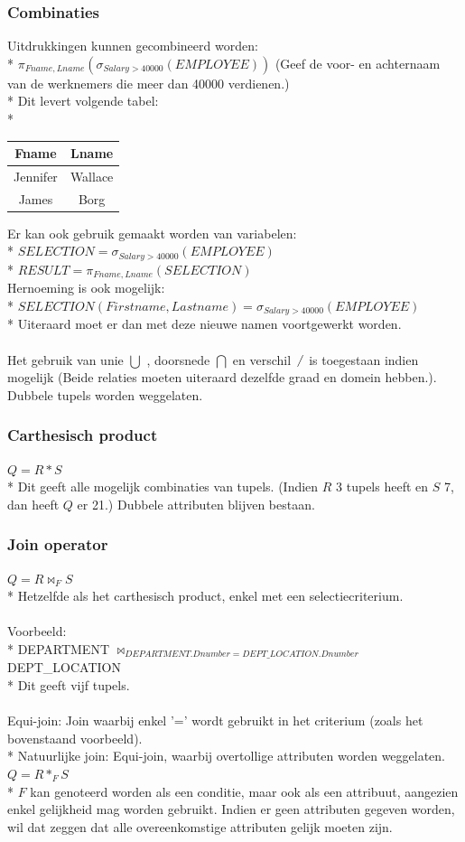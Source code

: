 \documentclass[10pt]{article}
\begin{document}
\subsubsection{Combinaties}
Uitdrukkingen kunnen gecombineerd worden:\\*
$\pi_{Fname, Lname}(\sigma_{Salary > 40000}(EMPLOYEE))$ (Geef de voor- en achternaam van de werknemers die meer dan 40000 verdienen.)\\*
Dit levert volgende tabel:\\*\begin{center}
\begin{tabular}{| c | c|}
\hline
Fname & Lname\\ \hline
Jennifer & Wallace\\ \hline
James & Borg\\ \hline
\end{tabular}
\end{center}
Er kan ook gebruik gemaakt worden van variabelen:\\*
$SELECTION = \sigma_{Salary > 40000}(EMPLOYEE)$\\*
$RESULT = \pi_{Fname, Lname}(SELECTION)$\\
Hernoeming is ook mogelijk:\\*
$SELECTION(Firstname, Lastname) = \sigma_{Salary > 40000}(EMPLOYEE)$\\*
Uiteraard moet er dan met deze nieuwe namen voortgewerkt worden.\\\\
Het gebruik van unie $\bigcup$ , doorsnede $\bigcap$ en verschil $\not\ \ $ is toegestaan indien mogelijk (Beide relaties moeten uiteraard dezelfde graad en domein hebben.). Dubbele tupels worden weggelaten.
\subsubsection{Carthesisch product}
$Q = R * S$\\*
Dit geeft alle mogelijk combinaties van tupels. (Indien $R$ 3 tupels heeft en $S$ 7, dan heeft $Q$ er 21.) Dubbele attributen blijven bestaan.
\subsubsection{Join operator}
$Q = R \bowtie_F S$\\*
Hetzelfde als het carthesisch product, enkel met een selectiecriterium.\\\\
Voorbeeld:\\*
DEPARTMENT $\bowtie_{DEPARTMENT.Dnumber = DEPT\_LOCATION.Dnumber}$ DEPT\_LOCATION\\*
Dit geeft vijf tupels.\\\\
Equi-join: Join waarbij enkel '=' wordt gebruikt in het criterium (zoals het bovenstaand voorbeeld).\\*
Natuurlijke join: Equi-join, waarbij overtollige attributen worden weggelaten. $Q = R *_F S$\\*
$F$ kan genoteerd worden als een conditie, maar ook als een attribuut, aangezien enkel gelijkheid mag worden gebruikt. Indien er geen attributen gegeven worden, wil dat zeggen dat alle overeenkomstige attributen gelijk moeten zijn.
\end{document}
